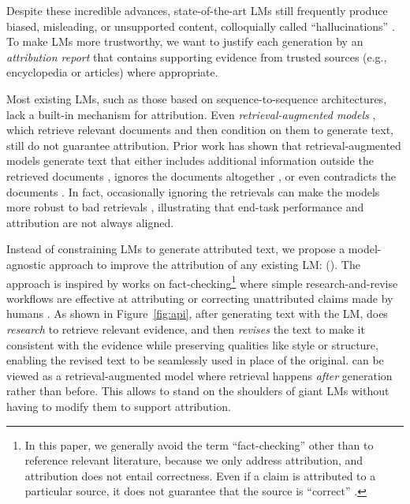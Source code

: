 \documentclass[11pt]{article}
\begin{document}
Despite these incredible advances, state-of-the-art LMs still frequently produce biased, misleading, or unsupported content, colloquially called ``hallucinations'' \cite{maynez2020faithfulness,menick2022teaching}. To make LMs more trustworthy, we want to justify each generation by an \emph{attribution report} \cite{Rashkin2021AIS,Bohnet2022AttributedQA} that contains supporting evidence from trusted sources (e.g., encyclopedia or articles) where appropriate.

Most existing LMs, such as those based on sequence-to-sequence architectures, lack a built-in mechanism for attribution. Even \emph{retrieval-augmented models} \cite{gu2020realm,lewis2020rag}, which retrieve relevant documents and then condition on them to generate text, still do not guarantee attribution.
Prior work has shown that retrieval-augmented models generate text that either includes additional information outside the retrieved documents \cite{dziri2022origin}, ignores the documents altogether \cite{krishna2021hurdles}, or even contradicts the documents \cite{longpre2021entity}. In fact, occasionally ignoring the retrievals can make the models more robust to bad retrievals \cite{khandelwal2019generalization}, illustrating that end-task performance and attribution are not always aligned.

Instead of constraining LMs to generate attributed text, we propose a model-agnostic approach to improve the attribution of any existing LM: \emph{\approachfull{}} (\approach{}).
The approach is inspired by works on fact-checking\footnote{In this paper, we generally avoid the term ``fact-checking'' other than to reference relevant literature, because we only address attribution, and attribution does not entail correctness. Even if a claim is attributed to a particular source, it does not guarantee that the source is ``correct'' \cite{menick2022teaching}.} where simple research-and-revise workflows are effective at attributing or correcting unattributed claims made by humans \cite{thorne2018fever,schuster2021get,thorne2021evidence}.
As shown in Figure~\ref{fig:api}, after generating text with the LM, \approach{} does \emph{research} to retrieve relevant evidence, and then \emph{revises} the text to make it consistent with the evidence while preserving qualities like style or structure, enabling the revised text to be seamlessly used in place of the original. \approach{} can be viewed as a retrieval-augmented model where retrieval happens \emph{after} generation rather than before. This allows \approach{} to stand on the shoulders of giant LMs without having to modify them to support attribution.
\end{document}

